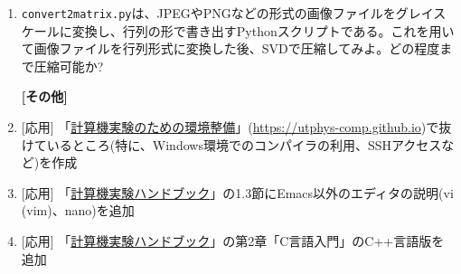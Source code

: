 \documentclass[11pt]{jarticle}
\begin{document}
\begin{enumerate}
\item {\tt convert2matrix.py}は、JPEGやPNGなどの形式の画像ファイルをグレイスケールに変換し、行列の形で書き出すPythonスクリプトである。これを用いて画像ファイルを行列形式に変換した後、SVDで圧縮してみよ。どの程度まで圧縮可能か?

  \hspace*{-2em} {\bf [その他]}

\item \mbox{} [応用] 「\href{https://utphys-comp.github.io}{計算機実験のための環境整備}」({\small \href{https://utphys-comp.github.io}{https://utphys-comp.github.io}})で抜けているところ(特に、Windows環境でのコンパイラの利用、SSHアクセスなど)を作成

\item \mbox{} [応用] 「\href{https://github.com/utphys-comp/handbook/releases/download/handbook-2019/handbook.pdf}{計算機実験ハンドブック}」の1.3節にEmacs以外のエディタの説明(vi (vim)、nano)を追加

\item \mbox{} [応用] 「\href{https://github.com/utphys-comp/handbook/releases/download/handbook-2019/handbook.pdf}{計算機実験ハンドブック}」の第2章「C言語入門」のC++言語版を追加

\end{enumerate}  
\end{document}
